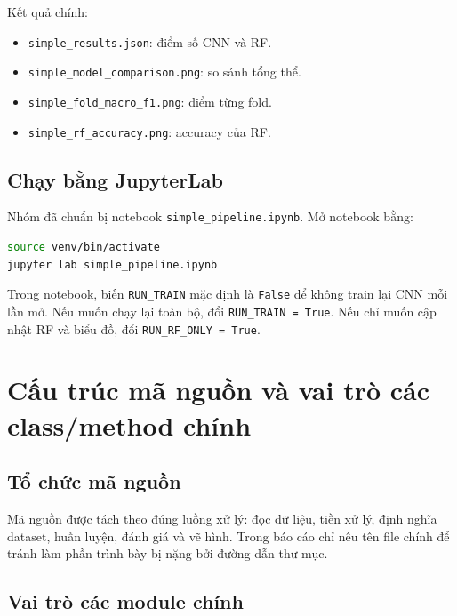 \documentclass[12pt,a4paper]{article}
\begin{document}
Kết quả chính:

\begin{itemize}
    \item \texttt{simple\_results.json}: điểm số CNN và RF.
    \item \texttt{simple\_model\_comparison.png}: so sánh tổng thể.
    \item \texttt{simple\_fold\_macro\_f1.png}: điểm từng fold.
    \item \texttt{simple\_rf\_accuracy.png}: accuracy của RF.
\end{itemize}

\subsection{Chạy bằng JupyterLab}

Nhóm đã chuẩn bị notebook \texttt{simple\_pipeline.ipynb}. Mở notebook bằng:

\begin{lstlisting}[language=bash]
source venv/bin/activate
jupyter lab simple_pipeline.ipynb
\end{lstlisting}

Trong notebook, biến \texttt{RUN\_TRAIN} mặc định là \texttt{False} để không train lại CNN mỗi lần mở. Nếu muốn chạy lại toàn bộ, đổi \texttt{RUN\_TRAIN = True}. Nếu chỉ muốn cập nhật RF và biểu đồ, đổi \texttt{RUN\_RF\_ONLY = True}.

\section{Cấu trúc mã nguồn và vai trò các class/method chính}

\subsection{Tổ chức mã nguồn}

Mã nguồn được tách theo đúng luồng xử lý: đọc dữ liệu, tiền xử lý, định nghĩa dataset, huấn luyện, đánh giá và vẽ hình. Trong báo cáo chỉ nêu tên file chính để tránh làm phần trình bày bị nặng bởi đường dẫn thư mục.

\subsection{Vai trò các module chính}
\end{document}
